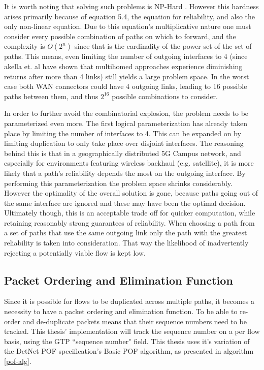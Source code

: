 It is worth noting that solving such problems is NP-Hard \cite{krentel1986complexity, }. However this hardness arises primarily because of equation 5.4, the equation for reliability, and also the only non-linear equation. Due to this equation's multiplicative nature one must consider every possible combination of paths on which to forward, and the complexity is $O(2^n)$ since that is the cardinality of the power set of the set of paths. This means, even limiting the number of outgoing interfaces to 4 (since akella et. al \cite{akella2003measurement} have shown that multihomed approaches experience diminishing returns after more than 4 links) still yields a large problem space. In the worst case both WAN connectors could have 4 outgoing links, leading to 16 possible paths between them, and thus $2^{16}$ possible combinations to consider.

In order to further avoid the combinatorial explosion, the problem needs to be parameterized even more. The first logical parameterization has already taken place by limiting the number of interfaces to 4. This can be expanded on by limiting duplication to only take place over disjoint interfaces. The reasoning behind this is that in a geographically distributed 5G Campus network, and especially for environments featuring wireless backhaul (e.g. satellite), it is more likely that a path's reliability depends the most on the outgoing interface. By performing this parameterization the problem space shrinks considerably. However the optimality of the overall solution is gone, because paths going out of the same interface are ignored and these may have been the optimal decision. Ultimately though, this is an acceptable trade off for quicker computation, while retaining reasonably strong guarantees of reliability. When choosing a path from a set of paths that use the same outgoing link only the path with the greatest reliability is taken into consideration. That way the likelihood of inadvertently rejecting a potentially viable flow is kept low.

\subsection{Packet Ordering and Elimination Function}

Since it is possible for flows to be duplicated across multiple paths, it becomes a necessity to have a packet ordering and elimination function. To be able to re-order and de-duplicate packets means that their sequence numbers need to be tracked. This thesis' implementation will track the sequence number on a per flow basis, using the GTP “sequence number" field. This thesis uses it's variation of the DetNet POF specification's Basic POF algorithm, as presented in algorithm \ref{pof-alg}.

